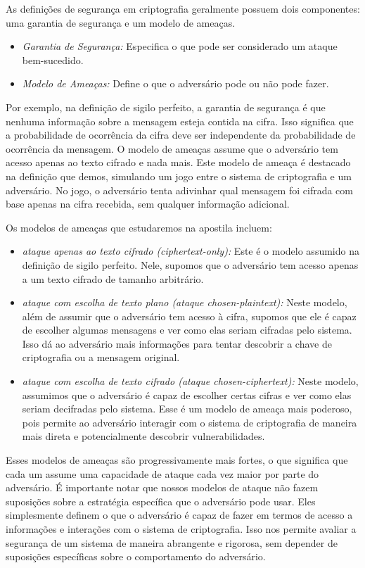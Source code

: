 As definições de segurança em criptografia geralmente possuem dois componentes: uma garantia de segurança e um modelo de ameaças.
\begin{itemize}
\item {\em Garantia de Segurança:} Especifica o que pode ser considerado um ataque bem-sucedido.
\item {\em Modelo de Ameaças:} Define o que o adversário pode ou não pode fazer.
\end{itemize}

Por exemplo, na definição de sigilo perfeito, a garantia de segurança é que nenhuma informação sobre a mensagem esteja contida na cifra.
Isso significa que a probabilidade de ocorrência da cifra deve ser independente da probabilidade de ocorrência da mensagem.
O modelo de ameaças assume que o adversário tem acesso apenas ao texto cifrado e nada mais.
Este modelo de ameaça é destacado na definição que demos, simulando um jogo entre o sistema de criptografia e um adversário.
No jogo, o adversário tenta adivinhar qual mensagem foi cifrada com base apenas na cifra recebida, sem qualquer informação adicional.

Os modelos de ameaças que estudaremos na apostila incluem:
\begin{itemize}
\item {\em ataque apenas ao texto cifrado (ciphertext-only):} 
  Este é o modelo assumido na definição de sigilo perfeito.
  Nele, supomos que o adversário tem acesso apenas a um texto cifrado de tamanho arbitrário.
\item {\em ataque com escolha de texto plano (ataque chosen-plaintext):}
  Neste modelo, além de assumir que o adversário tem acesso à cifra, supomos que ele é capaz de escolher algumas mensagens e ver como elas seriam cifradas pelo sistema.
  Isso dá ao adversário mais informações para tentar descobrir a chave de criptografia ou a mensagem original.
\item {\em ataque com escolha de texto cifrado (ataque chosen-ciphertext):}
  Neste modelo, assumimos que o adversário é capaz de escolher certas cifras e ver como elas seriam decifradas pelo sistema.
  Esse é um modelo de ameaça mais poderoso, pois permite ao adversário interagir com o sistema de criptografia de maneira mais direta e potencialmente descobrir vulnerabilidades.
\end{itemize}

Esses modelos de ameaças são progressivamente mais fortes, o que significa que cada um assume uma capacidade de ataque cada vez maior por parte do adversário.
É importante notar que nossos modelos de ataque não fazem suposições sobre a estratégia específica que o adversário pode usar.
Eles simplesmente definem o que o adversário é capaz de fazer em termos de acesso a informações e interações com o sistema de criptografia.
Isso nos permite avaliar a segurança de um sistema de maneira abrangente e rigorosa, sem depender de suposições específicas sobre o comportamento do adversário.

